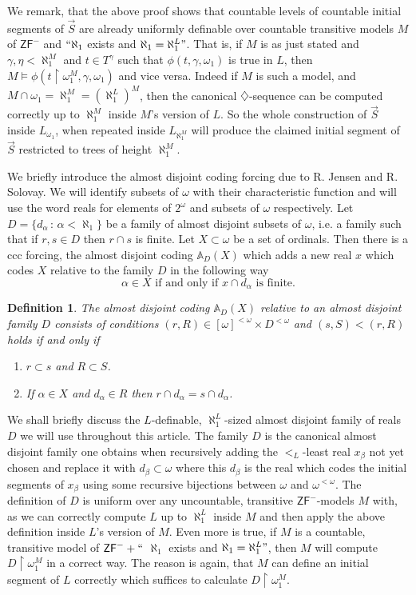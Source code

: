 \documentclass[a4paper,11pt]{article}
\newtheorem{definition}[theorem]{Definition}
\newcommand{\ZFP}{\mathsf{ZF}^-}
\begin{document}
We remark, that the above proof shows that countable levels of countable initial segments of $\vec{S}$ are already uniformly definable over countable transitive models $M$ of $\ZFP$ and $``\aleph_1$ exists and $\aleph_1= \aleph_1^L"$.
That is, if $M$ is as just stated and $\gamma, \eta<\aleph_1^M$ and $t \in T^{\gamma}$ such that $\phi(t,\gamma,\omega_1)$ is true in $L$, then $M \models \phi (t \upharpoonright \omega_1^M,\gamma,\omega_1)$ and vice versa. Indeed if $M$ is such a model, and $ M \cap \omega_1=\aleph_1^M= (\aleph_1^L)^M$, then
the canonical $\diamondsuit$-sequence can be computed correctly up to $\aleph_1^M$ inside $M$'s version of $L$. So the whole construction of $\vec{S}$ inside $L_{\omega_1}$, when repeated inside $L_{\aleph_1^M}$ will produce the claimed initial segment of $\vec{S}$ restricted to trees of height $\aleph_1^M$.



We briefly introduce the almost disjoint coding forcing due to R. Jensen and R. Solovay. We will identify subsets of $\omega$ with their characteristic function and will use the word reals for elements of $2^{\omega}$ and subsets of $\omega$ respectively.
Let $D=\{d_{\alpha} \, : \, \alpha < \aleph_1 \}$ be a family of almost disjoint subsets of $\omega$, i.e. a family such that if $r, s \in D$ then 
$r \cap s$ is finite. Let $X\subset  \omega$  be a set of ordinals. Then there 
is a ccc forcing, the almost disjoint coding $\mathbb{A}_D(X)$ which adds 
a new real $x$ which codes $X$ relative to the family $D$ in the following way
$$\alpha \in X \text{ if and only if } x \cap d_{\alpha} \text{ is finite.}$$
\begin{definition}\label{definitionadcoding}
 The almost disjoint coding $\mathbb{A}_D(X)$ relative to an almost disjoint family $D$ consists of
 conditions $(r, R) \in [\omega]^{<\omega} \times D^{<\omega}$ and
 $(s,S) < (r,R)$ holds if and only if
 \begin{enumerate}
  \item $r \subset s$ and $R \subset S$.
  \item If $\alpha \in X$ and $d_{\alpha} \in R$ then $r \cap d_{\alpha} = s \cap d_{\alpha}$.
 \end{enumerate}
\end{definition}
We shall briefly discuss the $L$-definable, $\aleph_1^L$-sized almost disjoint family of reals $D$  we will use throughout this article. The family $D$ is the canonical almost disjoint family one obtains when recursively adding the $<_L$-least real $x_{\beta}$ not yet chosen and replace it with $d_{\beta} \subset \omega$ where this $d_{\beta}$  is the real which codes the initial segments of $x_{\beta}$ using some recursive bijections between $\omega$ and $\omega^{<\omega}$. The definition of $D$ is uniform over any uncountable, transitive $\ZFP$-models $M$ with, as we can correctly compute $L$ up to $\aleph_1^L$ inside $M$ and then apply the above definition inside $L$'s version of $M$. Even more is true, if $M$ is a countable, transitive model of $\ZFP+``$ $\aleph_1$ exists and $\aleph_1=\aleph_1^L"$, then $M$ will compute $D \upharpoonright \omega_1^M$ in a correct way. The reason is again, that $M$ can define an initial segment of $L$ correctly which suffices to calculate $D \upharpoonright \omega_1^M$.
\end{document}
